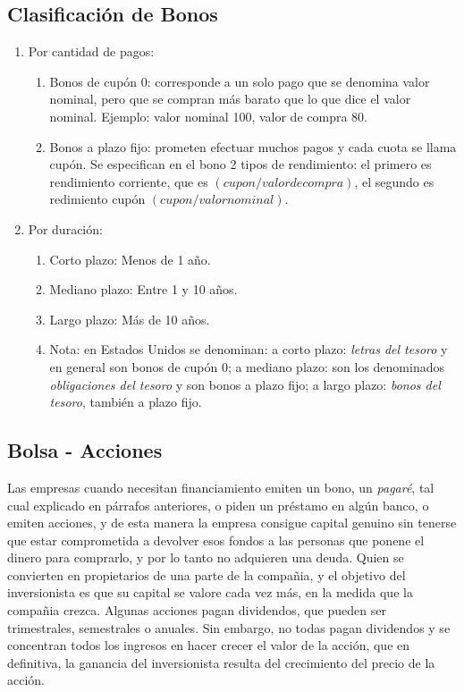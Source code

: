 \subsection{Clasificación de Bonos}

\begin{enumerate}
    \item Por cantidad de pagos:
    \begin{enumerate}
	\item Bonos de cupón 0: corresponde a un solo pago que se denomina
	    valor nominal, pero que se compran más barato que lo que dice el
	    valor nominal. Ejemplo: valor nominal 100, valor de compra 80.
	\item Bonos a plazo fijo: prometen efectuar muchos pagos y cada cuota
	    se llama cupón. Se especifican en el bono 2 tipos de rendimiento:
	    el primero es rendimiento corriente, que es $(cupon/valor de
	    compra)$, el segundo es redimiento cupón $(cupon/valor nominal)$.
    \end{enumerate}
    \item Por duración:
    \begin{enumerate}
	\item Corto plazo: Menos de 1 año.
	\item Mediano plazo: Entre 1 y 10 años.
	\item Largo plazo: Más de 10 años.
	\item Nota:
	en Estados Unidos se denominan: a corto plazo: \emph{letras del tesoro}
	y en general son bonos de cupón 0; a mediano plazo: son los denominados
	\emph{obligaciones del tesoro} y son bonos a plazo fijo; a largo plazo:
	\emph{bonos del tesoro}, también a plazo fijo.
    \end{enumerate}
\end{enumerate}

\subsection{Bolsa - Acciones}

Las empresas cuando necesitan financiamiento emiten un bono, un \emph{pagaré},
tal cual explicado en párrafos anteriores, o piden un préstamo en algún banco,
o emiten acciones, y de esta manera la empresa consigue capital genuino sin
tenerse que estar comprometida a devolver esos fondos a las personas que ponene
el dinero para comprarlo, y por lo tanto no adquieren una deuda. Quien se
convierten en propietarios de una parte de la compañia, y el objetivo del
inversionista es que su capital se valore cada vez más, en la medida que la
compañia crezca. Algunas acciones pagan dividendos, que pueden ser
trimestrales, semestrales o anuales. Sin embargo, no todas pagan dividendos y
se concentran todos los ingresos en hacer crecer el valor de la acción, que en
definitiva, la ganancia del inversionista resulta del crecimiento del precio de
la acción.

